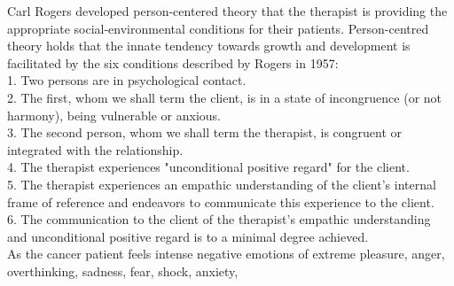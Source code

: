 \documentclass[12pt, a4paper]{article}
\begin{document}
Carl Rogers developed person-centered theory that the therapist is providing the appropriate social-environmental conditions for their patients\citep{Rogers1957}\citep{Joseph2004}\citep{Griffiths2013}.
Person-centred theory holds that the innate tendency towards growth and development is facilitated by the six conditions described by Rogers in 1957\citep{Rogers1957}:\\
1. Two persons are in psychological contact. \\
2. The first, whom we shall term the client, is in a state of incongruence (or not harmony), being vulnerable or anxious. \\
3. The second person, whom we shall term the therapist, is congruent
or integrated with the relationship. \\
4. The therapist experiences "unconditional positive regard" for the client. \\
5. The therapist experiences an empathic understanding of the client's
internal frame of reference and endeavors to communicate this experience to the client. \\
6. The communication to the client of the therapist's empathic understanding and unconditional positive regard is to a minimal degree achieved.\\
As the cancer patient feels intense negative emotions of extreme pleasure, anger, overthinking, sadness, fear, shock, anxiety, 
\end{document}
